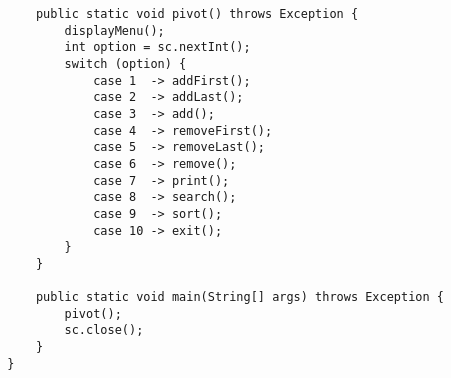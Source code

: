 \documentclass[12pt,titlepage]{article}
\begin{document}
\begin{enumerate}
\begin{verbatim}
            public static void pivot() throws Exception {
                displayMenu();
                int option = sc.nextInt();
                switch (option) {
                    case 1  -> addFirst();
                    case 2  -> addLast();
                    case 3  -> add();
                    case 4  -> removeFirst();
                    case 5  -> removeLast();
                    case 6  -> remove();
                    case 7  -> print();
                    case 8  -> search();
                    case 9  -> sort();
                    case 10 -> exit();
                }
            }

            public static void main(String[] args) throws Exception {
                pivot();
                sc.close();
            }
        }
    \end{verbatim}
\end{enumerate}
\end{document}
